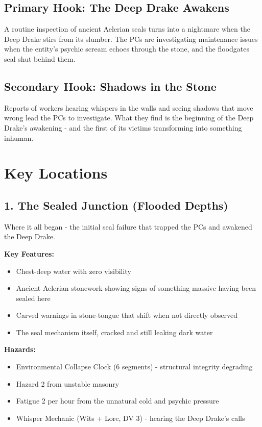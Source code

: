 \documentclass[11pt]{article}
\begin{document}
\subsection{Primary Hook: The Deep Drake Awakens}

A routine inspection of ancient Aelerian seals turns into a nightmare when the Deep Drake stirs from its slumber. The PCs are investigating maintenance issues when the entity's psychic scream echoes through the stone, and the floodgates seal shut behind them.

\subsection{Secondary Hook: Shadows in the Stone}

Reports of workers hearing whispers in the walls and seeing shadows that move wrong lead the PCs to investigate. What they find is the beginning of the Deep Drake's awakening - and the first of its victims transforming into something inhuman.

\section{Key Locations}

\subsection{1. The Sealed Junction (Flooded Depths)}

Where it all began - the initial seal failure that trapped the PCs and awakened the Deep Drake.

\textbf{Key Features:}
\begin{itemize}
\item Chest-deep water with zero visibility
\item Ancient Aelerian stonework showing signs of something massive having been sealed here
\item Carved warnings in stone-tongue that shift when not directly observed
\item The seal mechanism itself, cracked and still leaking dark water
\end{itemize}

\textbf{Hazards:}
\begin{itemize}
\item Environmental Collapse Clock (6 segments) - structural integrity degrading
\item Hazard 2 from unstable masonry
\item Fatigue 2 per hour from the unnatural cold and psychic pressure
\item Whisper Mechanic (Wits + Lore, DV 3) - hearing the Deep Drake's calls
\end{itemize}
\end{document}

